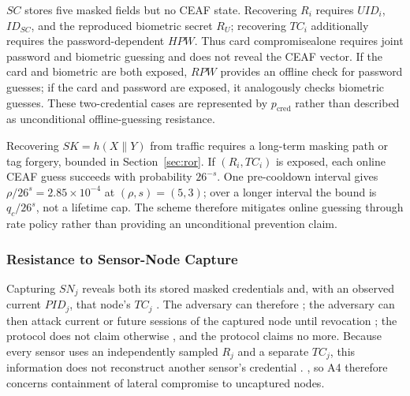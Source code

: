 \documentclass[cmc,article,submit,moreauthors,pdftex]{Definitions/tsp}
\newcommand{\cc}{\mathbin{\|}}
\providecommand{\DIFadd}[1]{{\protect\color{blue} \sf #1}} %
\providecommand{\DIFdel}[1]{{\protect\color{red} \scriptsize #1}} %
\providecommand{\DIFaddbegin}{} %
\providecommand{\DIFaddend}{} %
\providecommand{\DIFdelbegin}{} %
\providecommand{\DIFdelend}{} %
\begin{document}
\DIFdelbegin %

\DIFdel{$SC$ stores five masked fields but no CEAF state. Recovering $R_i$ requires $UID_i$, $ID_{SC}$, and the reproduced biometric secret $R_U$; recovering $TC_i$ additionally requires the password-dependent $HPW$. Thus card compromisealone requires joint password and biometric guessing and does not reveal the CEAF vector.
If the card and biometric are both exposed, $RPW$ provides an offline check for password guesses; if the card and password are exposed, it analogously checks biometric guesses. These two-credential cases are represented by $p_{\mathrm{cred}}$ rather than described as unconditional offline-guessing resistance.
}%


\DIFdel{Recovering $SK=h(X\cc Y)$ from traffic requires a long-term masking path or tag forgery, bounded in Section~\ref{sec:ror}. If $(R_i,TC_i)$ is exposed, each online CEAF guess succeeds with probability $26^{-s}$. One pre-cooldown interval gives $\rho/26^s=2.85\times10^{-4}$ at $(\rho,s)=(5,3)$; over a longer interval the bound is $q_c/26^s$, not a lifetime cap. The scheme therefore mitigates online guessing through rate policy rather than providing an unconditional prevention claim.
}%

\DIFdelend \subsubsection{Resistance to Sensor-Node Capture}

Capturing $SN_j$ reveals \DIFdelbegin \DIFdel{both }\DIFdelend \DIFaddbegin \DIFadd{its }\DIFaddend stored masked credentials and, with an observed current $PID_j$, that node's $TC_j$\DIFdelbegin \DIFdel{. The adversary can therefore }\DIFdelend \DIFaddbegin \DIFadd{; the adversary can then }\DIFaddend attack current or future sessions of the captured node until revocation\DIFdelbegin \DIFdel{; the protocol does not claim otherwise}\DIFdelend \DIFaddbegin \DIFadd{, and the protocol claims no more}\DIFaddend . Because every sensor uses \DIFaddbegin \DIFadd{an }\DIFaddend independently sampled $R_j$ and a separate $TC_j$, this \DIFdelbegin \DIFdel{information }\DIFdelend does not reconstruct another sensor's credential\DIFdelbegin \DIFdel{. }\DIFdelend \DIFaddbegin \DIFadd{, so }\DIFaddend A4 \DIFdelbegin \DIFdel{therefore }\DIFdelend concerns containment of lateral compromise to uncaptured nodes.
\end{document}
